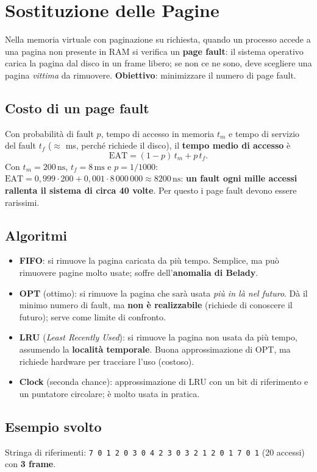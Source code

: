 \section{Sostituzione delle Pagine}
Nella memoria virtuale con paginazione su richiesta, quando un processo accede a una pagina non presente in RAM si verifica un \textbf{page fault}: il sistema operativo carica la pagina dal disco in un frame libero; se non ce ne sono, deve scegliere una pagina \emph{vittima} da rimuovere. \textbf{Obiettivo}: minimizzare il numero di page fault.

\subsection{Costo di un page fault}
Con probabilità di fault $p$, tempo di accesso in memoria $t_m$ e tempo di servizio del fault $t_f$ ($\approx$ ms, perché richiede il disco), il \textbf{tempo medio di accesso} è
\[
\text{EAT} = (1-p)\,t_m + p\,t_f .
\]
Con $t_m = 200\,\text{ns}$, $t_f = 8\,\text{ms}$ e $p = 1/1000$:
$\text{EAT} = 0{,}999\cdot 200 + 0{,}001 \cdot 8\,000\,000 \approx 8200\,\text{ns}$: \textbf{un fault ogni mille accessi rallenta il sistema di circa 40 volte}. Per questo i page fault devono essere rarissimi.

\subsection{Algoritmi}
\begin{itemize}
    \item \textbf{FIFO}: si rimuove la pagina caricata da più tempo. Semplice, ma può rimuovere pagine molto usate; soffre dell'\textbf{anomalia di Belady}.
    \item \textbf{OPT} (ottimo): si rimuove la pagina che sarà usata \emph{più in là nel futuro}. Dà il minimo numero di fault, ma \textbf{non è realizzabile} (richiede di conoscere il futuro); serve come limite di confronto.
    \item \textbf{LRU} (\emph{Least Recently Used}): si rimuove la pagina non usata da più tempo, assumendo la \textbf{località temporale}. Buona approssimazione di OPT, ma richiede hardware per tracciare l'uso (costoso).
    \item \textbf{Clock} (seconda chance): approssimazione di LRU con un bit di riferimento e un puntatore circolare; è molto usata in pratica.
\end{itemize}

\subsection{Esempio svolto}
Stringa di riferimenti: \texttt{7 0 1 2 0 3 0 4 2 3 0 3 2 1 2 0 1 7 0 1} (20 accessi) con \textbf{3 frame}.

